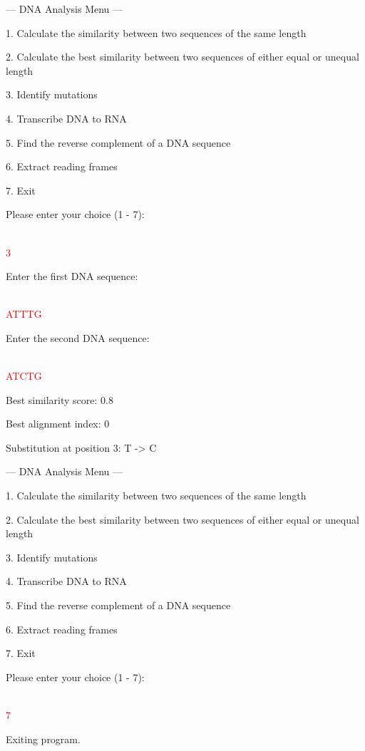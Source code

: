 \begin{sample}

    --- DNA Analysis Menu ---
    
    1. Calculate the similarity between two sequences of the same length
    
    2. Calculate the best similarity between two sequences of either equal or unequal length
    
    3. Identify mutations
    
    4. Transcribe DNA to RNA
    
    5. Find the reverse complement of a DNA sequence
    
    6. Extract reading frames
    
    7. Exit
    
    Please enter your choice (1 - 7): 
    
    \\\textcolor{red}{3}

    Enter the first DNA sequence:

    \\\textcolor{red}{ATTTG}

    Enter the second DNA sequence: 

    \\\textcolor{red}{ATCTG}

    Best similarity score: 0.8
    
    Best alignment index: 0
    
    Substitution at position 3: T -> C
    
    --- DNA Analysis Menu ---
    
    1. Calculate the similarity between two sequences of the same length
   
    2. Calculate the best similarity between two sequences of either equal or unequal length
    
    3. Identify mutations
    
    4. Transcribe DNA to RNA
    
    5. Find the reverse complement of a DNA sequence
    
    6. Extract reading frames
    
    7. Exit
    
    Please enter your choice (1 - 7): 
    
    \\\textcolor{red}{7}
    
    Exiting program.
\end{sample}

